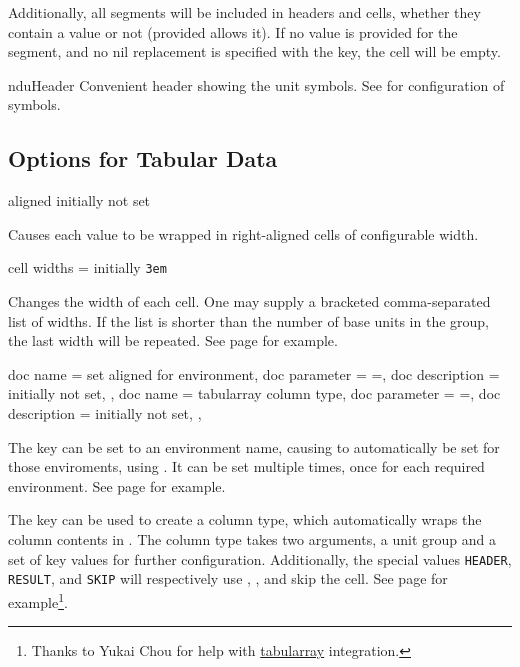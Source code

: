 \documentclass[
	a4paper,
]{article}
\begin{document}
Additionally, all segments will be included in headers and cells, whether they contain a value or not (provided  allows it). If no value is provided for the segment, and no nil replacement is specified with the  key, the cell will be empty.

\begin{docCommand}
	{nduHeader}
	{}
	Convenient header showing the unit symbols. See  for configuration of symbols.
\end{docCommand}

\subsection{Options for Tabular Data}

\begin{docKey}
	{aligned}
	{}
	{initially not set}

Causes each value to be wrapped in right-aligned cells of configurable width.
\end{docKey}

\begin{docKey}
	{cell widths}
	{=}
	{initially \texttt{3em}}

Changes the width of each cell. One may supply a bracketed comma-separated list of widths. If the list is shorter than the number of base units in the group, the last width will be repeated. See page \pageref{example:table:widths} for example.
\end{docKey}

\begin{docKeys}
	[]
	{
		{
			doc name = set aligned for environment,
			doc parameter = {=},
			doc description = {initially not set},
		},
		{
			doc name = tabularray column type,
			doc parameter = {=},
			doc description = {initially not set},
		},
	}

	The  key can be set to an environment name, causing  to automatically be set for those enviroments, using . It can be set multiple times, once for each required environment. See page \pageref{example:table:environment} for example.

	The  key can be used to create a column type, which automatically wraps the column contents in . The column type takes two arguments, a unit group and a set of key values for further configuration. Additionally, the special values \texttt{HEADER},  \texttt{RESULT}, and \texttt{SKIP} will respectively use , , and skip the cell. See page \pageref{example:table:tabularray} for example\footnote{Thanks to Yukai Chou for help with \href{https://github.com/lvjr/tabularray}{tabularray} integration.}.

\end{docKeys}
\end{document}
